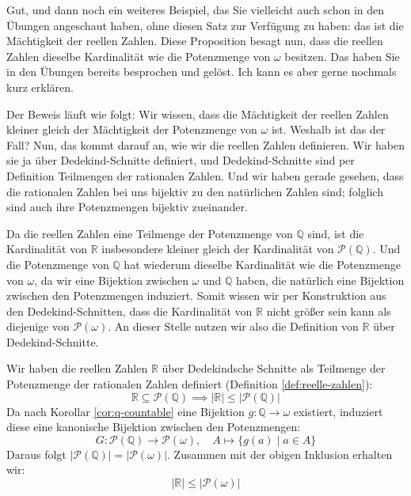\begin{spoken-clean}[00:35:33 - 00:37:51]
Gut, und dann noch ein weiteres Beispiel, das Sie vielleicht auch schon in den Übungen angeschaut haben, ohne diesen Satz zur Verfügung zu haben: das ist die Mächtigkeit der reellen Zahlen. Diese Proposition besagt nun, dass die reellen Zahlen dieselbe Kardinalität wie die Potenzmenge von $\omega$ besitzen. Das haben Sie in den Übungen bereits besprochen und gelöst. Ich kann es aber gerne nochmals kurz erklären.

Der Beweis läuft wie folgt: Wir wissen, dass die Mächtigkeit der reellen Zahlen kleiner gleich der Mächtigkeit der Potenzmenge von $\omega$ ist. Weshalb ist das der Fall? Nun, das kommt darauf an, wie wir die reellen Zahlen definieren. Wir haben sie ja über Dedekind-Schnitte definiert, und Dedekind-Schnitte sind per Definition Teilmengen der rationalen Zahlen. Und wir haben gerade gesehen, dass die rationalen Zahlen bei uns bijektiv zu den natürlichen Zahlen sind; folglich sind auch ihre Potenzmengen bijektiv zueinander.

Da die reellen Zahlen eine Teilmenge der Potenzmenge von $\mathbb{Q}$ sind, ist die Kardinalität von $\mathbb{R}$ insbesondere kleiner gleich der Kardinalität von $\mathcal{P}(\mathbb{Q})$. Und die Potenzmenge von $\mathbb{Q}$ hat wiederum dieselbe Kardinalität wie die Potenzmenge von $\omega$, da wir eine Bijektion zwischen $\omega$ und $\mathbb{Q}$ haben, die natürlich eine Bijektion zwischen den Potenzmengen induziert. Somit wissen wir per Konstruktion aus den Dedekind-Schnitten, dass die Kardinalität von $\mathbb{R}$ nicht größer sein kann als diejenige von $\mathcal{P}(\omega)$. An dieser Stelle nutzen wir also die Definition von $\mathbb{R}$ über Dedekind-Schnitte.
\end{spoken-clean}

\begin{math-stroke}
\begin{short-proof}
Wir haben die reellen Zahlen $\mathbb{R}$ über Dedekindsche Schnitte als Teilmenge der Potenzmenge der rationalen Zahlen definiert (Definition \ref{def:reelle-zahlen}):
\[
\mathbb{R} \subseteq \mathcal{P}(\mathbb{Q}) \implies |\mathbb{R}| \le |\mathcal{P}(\mathbb{Q})|
\]
Da nach Korollar \ref{cor:q-countable} eine Bijektion $g \colon \mathbb{Q} \to \omega$ existiert, induziert diese eine kanonische Bijektion zwischen den Potenzmengen:
\[
G \colon \mathcal{P}(\mathbb{Q}) \to \mathcal{P}(\omega), \quad A \mapsto \{ g(a) \mid a \in A \}
\]
Daraus folgt $|\mathcal{P}(\mathbb{Q})| = |\mathcal{P}(\omega)|$. Zusammen mit der obigen Inklusion erhalten wir:
\[
|\mathbb{R}| \le |\mathcal{P}(\omega)|
\]
\end{short-proof}
\end{math-stroke}

